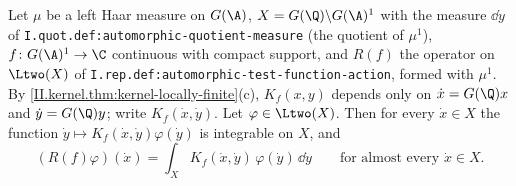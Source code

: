 Let $\mu$ be a left Haar measure on $G(\A)$, $X=G(\Q)\backslash G(\A)^1$ with the measure $\dd\dot y$ of
\texttt{I.quot.def:automorphic-quotient-measure} (the quotient of $\mu^1$), $f\colon G(\A)^1\to\C$ continuous with compact
support, and $R(f)$ the operator on $\Ltwo(X)$ of \texttt{I.rep.def:automorphic-test-function-action}, formed with $\mu^1$. By \cref{II.kernel.thm:kernel-locally-finite}(c), $K_f(x,y)$ depends only on $\dot x=G(\Q)x$ and $\dot y=G(\Q)y$; write
$K_f(\dot x,\dot y)$. Let $\varphi\in\Ltwo(X)$. Then for every $\dot x\in X$ the function $\dot y\mapsto K_f(\dot x,\dot y)\varphi(\dot y)$ is
integrable on $X$, and
\[
  (R(f)\varphi)(\dot x)=\int_XK_f(\dot x,\dot y)\,\varphi(\dot y)\,\dd\dot y\qquad\text{for almost every }\dot x\in X.
\]
